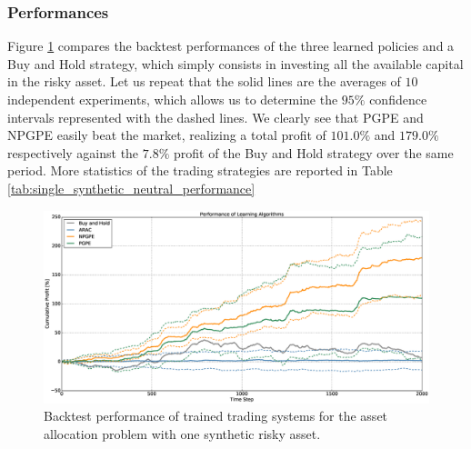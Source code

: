 \subsubsection{Performances}
Figure \ref{fig:single_synthetic_neutral_performance} compares the backtest performances of the three learned policies and a Buy and Hold strategy, which simply consists in investing all the available capital in the risky asset. Let us repeat that the solid lines are the averages of $10$ independent experiments, which allows us to determine the $95\%$ confidence intervals represented with the dashed lines. We clearly see that PGPE and NPGPE easily beat the market, realizing a total profit of $101.0\%$ and $179.0\%$ respectively against the $7.8\%$ profit of the Buy and Hold strategy over the same period. More statistics of the trading strategies are reported in Table \ref{tab:single_synthetic_neutral_performance}
\begin{figure}[t]
	\centering
	\includegraphics[width=1.0\textwidth]{Images/6_1_single_synthetic_neutral_performance}
	\caption[Backtest performance with one synthetic risky asset]{Backtest performance of trained trading systems for the asset allocation problem with one synthetic risky asset.}
	\label{fig:single_synthetic_neutral_performance}
\end{figure}
